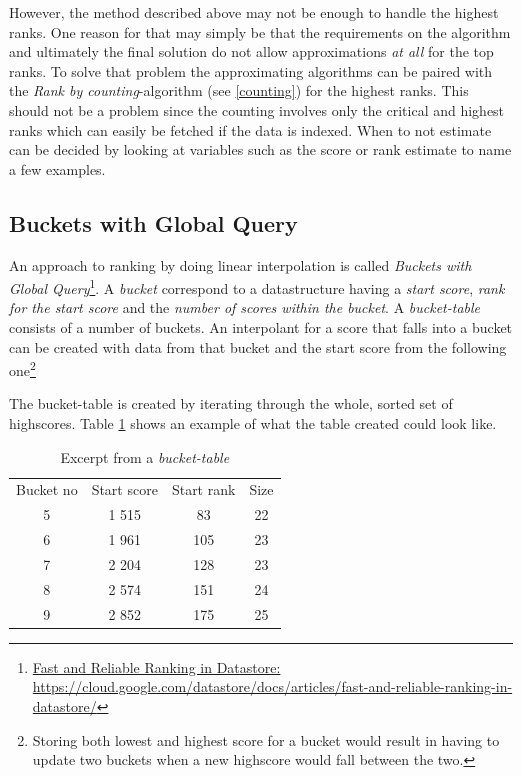 However, the method described above may not be enough to handle the highest ranks. One reason for that may simply be that the requirements on the algorithm and ultimately the final solution do not allow approximations \emph{at all} for the top ranks. To solve that problem the approximating algorithms can be paired with the \emph{Rank by counting}-algorithm (see \cref{counting}) for the highest ranks. This should not be a problem since  the counting involves only the critical and highest ranks which can easily be fetched if the data is indexed. When to not estimate can be decided by looking at variables such as the score or rank estimate to name a few examples.


\subsection{\label{bucket}Buckets with Global Query}

An approach to ranking by doing linear interpolation is called \emph{Buckets with Global Query}\footnote{\href{https://cloud.google.com/datastore/docs/articles/fast-and-reliable-ranking-in-datastore/}{Fast and Reliable Ranking in Datastore:\\ https://cloud.google.com/datastore/docs/articles/fast-and-reliable-ranking-in-datastore/}}. A \emph{bucket} correspond to a datastructure having a \emph{start score}, \emph{rank for the start score} and the \emph{number of scores within the bucket}. A \emph{bucket-table} consists of a number of buckets. An interpolant for a score that falls into a bucket can be created with data from that bucket and the start score from the following one\footnote{Storing both lowest and highest score for a bucket would result in having to update two buckets when a new highscore would fall between the two.}

The bucket-table is created by iterating through the whole, sorted set of highscores. Table \ref{table:ranking-table} shows an example of what the table created could look like.


\begin{table}[h]
  \begin{center}
  \begin{tabular}{ c c c c }
    Bucket no & Start score & Start rank & Size \\
    5 & 1 515 & 83 & 22 \\ 
    6 & 1 961 & 105 & 23 \\ 
    7 & 2 204 & 128 & 23 \\ 
    8 & 2 574 & 151 & 24 \\  
    9 & 2 852 & 175 & 25 \\ 
  \end{tabular} 
  \caption{Excerpt from a \emph{bucket-table}}
  \label{table:ranking-table}
  \end{center} 
\end{table}

